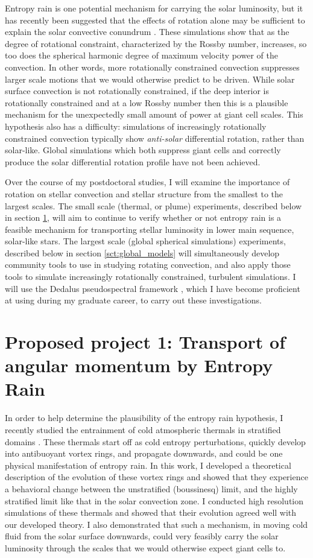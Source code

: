 \documentclass[aasms,12pt]{article}
\begin{document}
Entropy rain is one potential mechanism for carrying the solar luminosity, but it has recently been suggested that the effects of rotation alone may be sufficient to explain the solar convective conundrum \citep{featherstone&hindman2016}.
These simulations show that as the degree of rotational constraint, characterized by the Rossby number, increases, so too does the spherical harmonic degree of maximum velocity power of the convection.
In other words, more rotationally constrained convection suppresses larger scale motions that we would otherwise predict to be driven.
While solar surface convection is not rotationally constrained, if the deep interior is rotationally constrained and at a low Rossby number then this is a plausible mechanism for the unexpectedly small amount of power at giant cell scales.
This hypothesis also has a difficulty: simulations of increasingly rotationally constrained convection typically show \emph{anti-solar} differential rotation, rather than solar-like.
Global simulations which both suppress giant cells and correctly produce the solar differential rotation profile have not been achieved.

Over the course of my postdoctoral studies, I will examine the importance of rotation on stellar convection and stellar structure from the smallest to the largest scales.
The small scale (thermal, or plume) experiments, described below in section \ref{sct:thermals}, will aim to continue to verify whether or not entropy rain is a feasible mechanism for transporting stellar luminosity in lower main sequence, solar-like stars.
The largest scale (global spherical simulations) experiments, described below in section \ref{sct:global_models} will simultaneously develop community tools to use in studying rotating convection, and also apply those tools to simulate increasingly rotationally constrained, turbulent simulations.
I will use the Dedalus pseudospectral framework \citep{burns&all2019}, which I have become proficient at using during my graduate career, to carry out these investigations.


\section{Proposed project 1: Transport of angular momentum by Entropy Rain}
\label{sct:thermals}
In order to help determine the plausibility of the entropy rain hypothesis, I recently studied the entrainment of cold atmospheric thermals in stratified domains \citep{andersLB2019}.
These thermals start off as cold entropy perturbations, quickly develop into antibuoyant vortex rings, and propagate downwards, and could be one physical manifestation of entropy rain.
In this work, I developed a theoretical description of the evolution of these vortex rings and showed that they experience a behavioral change between the unstratified (boussinesq) limit, and the highly stratified limit like that in the solar convection zone.
I conducted high resolution simulations of these thermals and showed that their evolution agreed well with our developed theory.
I also demonstrated that such a mechanism, in moving cold fluid from the solar surface downwards, could very feasibly carry the solar luminosity through the scales that we would otherwise expect giant cells to.
\end{document}
